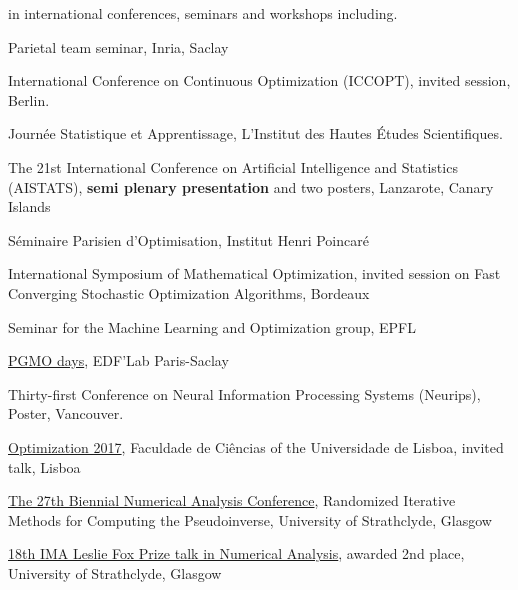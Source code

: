 	\begin{bibsection}
	\item [Over {\bf 30 talks}] in international conferences, seminars and workshops including.
\item [2019] Parietal team seminar, Inria, Saclay
\item  International Conference on Continuous Optimization (ICCOPT), invited session, Berlin.
\item Journ\'ee Statistique et Apprentissage, L'Institut des Hautes \'Etudes Scientifiques.
\item [2018] The 21st International Conference on
Artificial Intelligence and Statistics (AISTATS), {\bf semi plenary presentation} and two posters, Lanzarote, Canary Islands


\item {Séminaire Parisien d'Optimisation},  Institut Henri Poincaré

\item {International Symposium of Mathematical Optimization}, invited session on Fast Converging Stochastic Optimization Algorithms, Bordeaux


\item Seminar for the Machine Learning and Optimization group, {EPFL} %
		
		\item [2017] \href{https://www.fondation-hadamard.fr/fr/pgmo/pgmodays}{PGMO days}, EDF'Lab Paris-Saclay
		\item Thirty-first Conference on Neural Information Processing Systems (Neurips), Poster, Vancouver.
		
		\item \href{http://optimization2017.fc.ul.pt/}{Optimization 2017}, Faculdade de Ciências of the Universidade de Lisboa, invited talk, Lisboa

\item \href{https://numericalanalysisconference.org.uk/meetings/2017}{The 27th Biennial Numerical Analysis Conference}, Randomized Iterative Methods for Computing the Pseudoinverse, University of Strathclyde, Glasgow

\item \href{http://people.maths.ox.ac.uk/wathen/fox/prize.php}{18th IMA Leslie Fox Prize talk in Numerical Analysis}, awarded 2nd place, University of Strathclyde, Glasgow



\end{bibsection}
